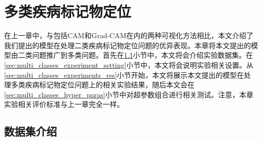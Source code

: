 \chapter{多类疾病标记物定位}\label{sec:multi_classes}
在上一章中，与包括CAM和Grad-CAM在内的两种可视化方法相比，本文介绍了我们提出的模型在处理二类疾病标记物定位问题的优异表现。本章将本文提出的模型由二类问题推广到多类问题。首先在\ref{sec:mul_classes_ds_intro}小节中，本文将会介绍实验数据集。在\ref{sec:multi_classes_experiment_setting}小节中，本文将会说明实验相关设置。从\ref{sec:multi_classes_experiments_res}小节开始，本文将展示本文提出的模型在处理多类疾病标记物定位问题上的相关实验结果，随后本文会在\ref{sec:multi_classes_hyper_paras}小节中对超参数组合进行相关测试。注意，本章实验相关评价标准与上一章完全一样。
\section{数据集介绍}\label{sec:mul_classes_ds_intro}
